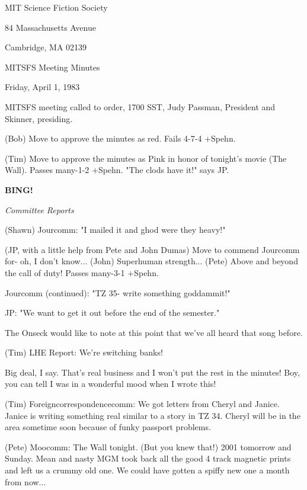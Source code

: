 \documentclass[12pt]{article}
\newcommand{\bing}{{\bf BING!} }
\newcommand{\goto}[1]{\bing \vskip 12pt \centerline{{\em{#1}}}}
\begin{document}
\begin{center}

MIT Science Fiction Society 

84 Massachusetts Avenue

Cambridge, MA 02139

\vspace{12pt}

MITSFS Meeting Minutes 

Friday, April 1, 1983

\end{center}
 
\vspace{18pt}

\setlength{\parskip}{6pt}

\noindent
MITSFS meeting called to order, 1700 SST,
Judy Passman, President and Skinner, presiding.

(Bob) Move to approve the minutes as red. Fails 4-7-4 +Spehn.

(Tim) Move to approve the minutes as Pink in honor of tonight's movie (The Wall). Passes many-1-2 +Spehn. "The clods have it!" says JP.

\goto{Committee Reports}

(Shawn) Jourcomm: "I mailed it and ghod were they heavy!"

(JP, with a little help from Pete and John Dumas) Move to commend Jourcomm for- oh, I don't know... (John) Superhuman strength... (Pete) Above and beyond the call of duty! Passes many-3-1 +Spehn.

Jourcomm (continued): "TZ 35- write something goddammit!"

JP: "We want to get it out before the end of the semester."

The Onseck would like to note at this point that we've all heard that song before.

(Tim) LHE Report: We're switching banks!

Big deal, I say. That's real business and I won't put the rest in the minutes! Boy, you can tell I was in a wonderful mood when I wrote this!

(Tim) Foreigncorrespondencecomm: We got letters from Cheryl and Janice. Janice is writing something real similar to a story in TZ 34. Cheryl will be in the area sometime soon because of funky passport problems.

(Pete) Moocomm: The Wall tonight. (But you knew that!) 2001 tomorrow and Sunday. Mean and nasty MGM took back all the good 4 track magnetic prints and left us a crummy old one. We could have gotten a spiffy new one a month from now...
\end{document}
